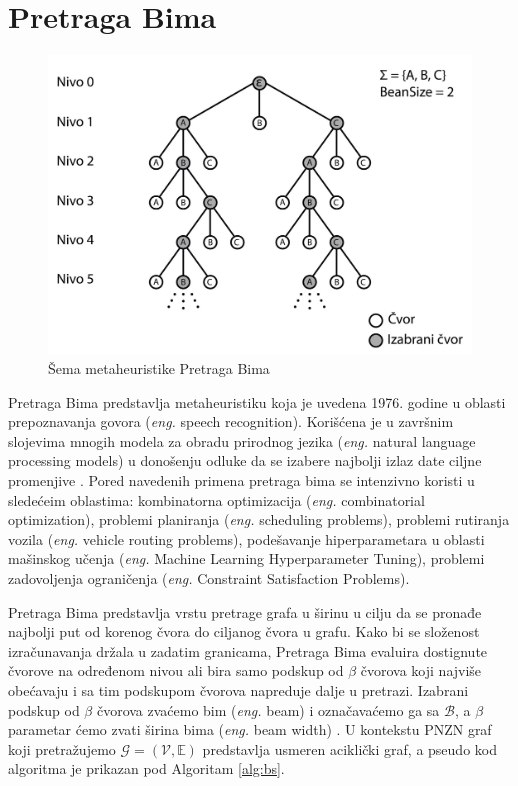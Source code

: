 \documentclass[12pt,oneside]{memoir}
\begin{document}
\section{Pretraga Bima}
\label{sec:pretragaBima}
\begin{figure}[!ht]
  \centering
  \includegraphics[width=1\textwidth]{Slike/bs2.png}
  \caption{Šema metaheuristike Pretraga Bima} 
  \label{fig:pretragaBima}
\end{figure}
Pretraga Bima predstavlja metaheuristiku koja je uvedena 1976. godine u oblasti prepoznavanja govora
(\textit{eng.} speech recognition). Korišćena je u završnim slojevima mnogih modela za
obradu prirodnog jezika (\textit{eng.} natural language processing models) u donošenju odluke da se izabere najbolji
izlaz date ciljne promenjive \cite{BSIntroduction}. Pored navedenih primena pretraga bima se intenzivno koristi u sledećeim
oblastima: kombinatorna optimizacija (\textit{eng.} combinatorial optimization), problemi planiranja (\textit{eng.} scheduling problems),
problemi rutiranja vozila (\textit{eng.} vehicle routing problems), podešavanje hiperparametara u oblasti mašinskog učenja
(\textit{eng.} Machine Learning Hyperparameter Tuning), problemi zadovoljenja ograničenja (\textit{eng.} Constraint Satisfaction Problems). 

Pretraga Bima predstavlja vrstu pretrage grafa u širinu u cilju da
se pronađe najbolji put od korenog čvora do ciljanog čvora u grafu. Kako bi se složenost izračunavanja držala u
zadatim granicama, Pretraga Bima evaluira dostignute čvorove na određenom nivou ali bira samo podskup od $\beta$
čvorova koji najviše obećavaju i sa tim podskupom čvorova napreduje dalje u pretrazi. Izabrani podskup od $\beta$ čvorova
zvaćemo bim (\textit{eng.} beam) i označavaćemo ga sa $\mathcal{B}$, a $\beta$ parametar ćemo zvati širina bima (\textit{eng.} beam width) \cite{SCSBS}.
U kontekstu PNZN graf koji pretražujemo $\mathcal{G}=(\mathcal{V},\mathbb{E})$ predstavlja usmeren aciklički graf, 
a pseudo kod algoritma je prikazan pod Algoritam \ref{alg:bs}.
\end{document}

